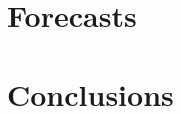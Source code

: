 \documentclass[preprint]{emulateapj}
\begin{document}
\section{Forecasts}
\label{sec:forecasts}

\section{Conclusions}
\label{sec:conclusions}




\end{document}
